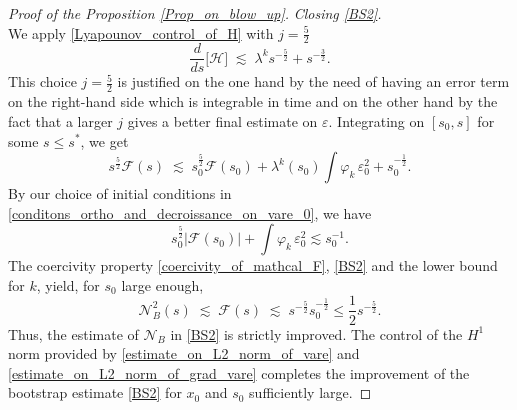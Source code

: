 \documentclass[16pt,english, oneside,reqno]{smfart}
\newcommand{\vare}{{\varepsilon}}
\newcommand{\vphi}{{\varphi}}
\begin{document}
\begin{proof}[Proof of the Proposition \ref{Prop_on_blow_up}]
\vspace{0.2cm}
\textit{Closing \eqref{BS2}.}\\
We apply \eqref{Lyapounov_control_of_H} with $j= \frac{5}{2}$ 
\begin{equation}
    \frac{d}{ds}\big[ \mathcal{H} \big] \;\lesssim\;  \lambda^k s^{-\frac 52} + s^{-\frac{3}{2}}.
\end{equation}
This choice $j=\frac 52$ is justified on the one hand by the need of having an error term on the 
right-hand side which is integrable in time and on the other hand by the fact that
a larger $j$ gives a better final estimate on $\vare$.
Integrating on $[s_0,s]$ for some $s\leq s^*$, we get
\begin{equation}
    s^{\frac{5}{2}}\mathcal{F}(s) \;\lesssim\; s^{\frac{5}{2}}_0 \mathcal{F}(s_0) + \lambda^k(s_0) \int \vphi_k\,\vare^2_0 + s_0^{-\frac 12}.
\end{equation}
By our choice of initial conditions in \eqref{conditons_ortho_and_decroissance_on_vare_0}, we have 
\begin{equation}
    s_0^\frac52\big| \mathcal{F}(s_0)\big| + \int \vphi_k\,\vare^2_0  \lesssim s_0^{-1}.
\end{equation}
The coercivity property \eqref{coercivity_of_mathcal_F}, \eqref{BS2} and the lower bound for $k$, yield, for $s_0$ large enough,
\begin{equation}
    \mathcal{N}^2_B(s) \;\lesssim\; \mathcal{F}(s)  \;\lesssim\; s^{-\frac 52}s_0^{-\frac12}
    \leq \frac12 s^{-\frac 52}.
\end{equation}
Thus, the estimate of $\mathcal{N}_B$ in \eqref{BS2} is strictly improved.
The control of the $H^1$ norm provided by \eqref{estimate_on_L2_norm_of_vare} and \eqref{estimate_on_L2_norm_of_grad_vare} completes the improvement of the
bootstrap estimate \eqref{BS2} for $x_0$ and $s_0$ sufficiently large.



\end{proof}
\end{document}
